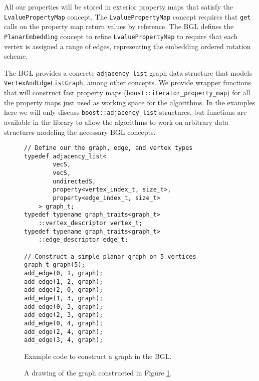 \documentclass[letterpaper, 12pt]{article}
\theoremstyle{definition}
\theoremstyle{definition}
\theoremstyle{thm}
\theoremstyle{definition}
\begin{document}
All our properties will be stored in exterior property maps that satisfy the
\texttt{Lvalue{\allowbreak}Property{\allowbreak}Map} concept. The \texttt{Lvalue{\allowbreak}Property{\allowbreak}Map} concept requires
that \texttt{get} calls on the property map return values by reference.
The BGL defines the \texttt{PlanarEmbedding} concept to refine
\texttt{Lvalue{\allowbreak}Property{\allowbreak}Map} to require that each vertex is assigned a range of
edges, representing the embedding ordered rotation scheme.

The BGL provides a concrete \texttt{adjacency\_list} graph data structure that
models \texttt{VertexAndEdgeListGraph}, among other concepts. We provide wrapper
functions that will construct fast property maps (\texttt{boost::iterator\_property\_map})
for all the property maps just used as working space for the algorithms.
In the examples here we will only discuss \texttt{boost::adjacency\_list} structures,
but functions are available in the library to allow the algorithms to work on
arbitrary data structures modeling the necessary BGL concepts.

\begin{figure}
\begin{lstlisting}[frame=single]
// Define our the graph, edge, and vertex types
typedef adjacency_list<
        vecS,
        vecS,
        undirectedS,
        property<vertex_index_t, size_t>,
        property<edge_index_t, size_t>
    > graph_t;
typedef typename graph_traits<graph_t>
    ::vertex_descriptor vertex_t;
typedef typename graph_traits<graph_t>
    ::edge_descriptor edge_t;

// Construct a simple planar graph on 5 vertices
graph_t graph(5);
add_edge(0, 1, graph);
add_edge(1, 2, graph);
add_edge(2, 0, graph);
add_edge(1, 3, graph);
add_edge(0, 3, graph);
add_edge(2, 3, graph);
add_edge(0, 4, graph);
add_edge(2, 4, graph);
add_edge(3, 4, graph);
\end{lstlisting}
\caption{Example code to construct a graph in the BGL.}
\label{example_make_graph}
\end{figure}

\begin{figure}
\begin{center}
\end{center}
\caption{A drawing of the graph constructed in Figure \ref{example_make_graph}.}
\end{figure}
\end{document}
